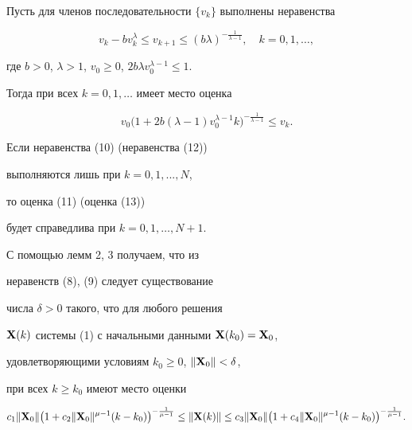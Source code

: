 \begin{lem}


Пусть для членов последовательности $\{v_k\}$ выполнены неравенства


\begin{equation}


v_k-bv^\lambda_k\leq v_{k+1}\leq


(b\lambda)^{-\frac1{\lambda-1}}, \quad k=0,1,\dotsc,


\end{equation}


где $b>0$, $\lambda>1$, $v_0\geq 0$, $2b \lambda v^{\lambda-1}_0\leq 1$.


Тогда при всех $k=0,1,\dotsc$ имеет место оценка


\begin{equation}


v_0 \big(1+ 2b (\lambda-1) v^{\lambda-1}_0 k


\big)^{-\frac1{\lambda-1}}\leq v_k.


\end{equation}


\end{lem}





\begin{note}


Если неравенства (10) (неравенства (12))


выполняются лишь при $k=0,1,...,N$,     %


то оценка (11) (оценка (13))


будет справедлива при $k=0,1,\dotsc,N+1$.


\end{note}





С помощью лемм 2, 3 получаем, что из


неравенств (8), (9) следует существование


числа $\delta>0$ такого, что для любого решения


$\bold X(k)$ системы (1) с начальными данными $\bold X(k_0)=\bold X_0$,


удовлетворяющими условиям $k_0\geq 0$, $\|\bold X_0\|<\delta$,


при всех $k\geq k_0$ имеют место оценки


\begin{equation}


c_1 \|\bold X_0\|


\big(1 +c_2 \|\bold X_0\|^{\mu-1}(k-k_0)\big)^{-\frac1{\mu-1}}


\leq \| \bold X(k)\|\leq 


c_3 \|\bold X_0\|


\big(1 +c_4 \|\bold X_0\|^{\mu-1}(k-k_0)\big)^{-\frac1{\mu-1}}.


\end{equation}



